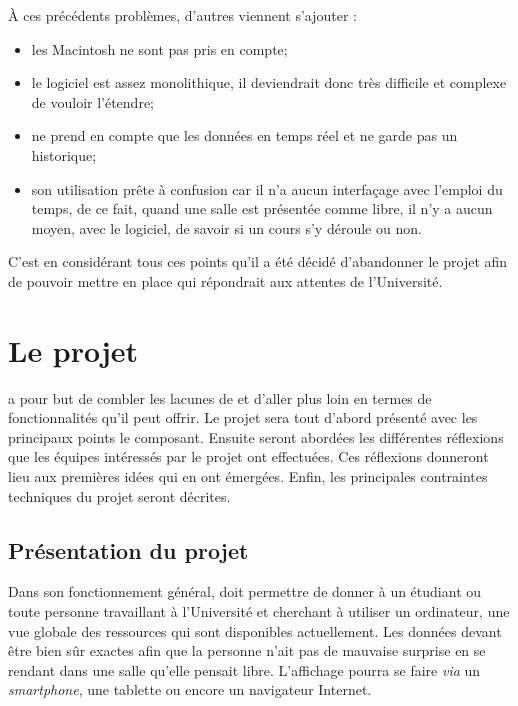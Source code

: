 \noindent \`A ces pr\'ec\'edents probl\`emes, d'autres viennent s'ajouter :

\begin{itemize}
	\item les Macintosh ne sont pas pris en compte;
	\item le logiciel est assez monolithique, il deviendrait donc tr\`es difficile et complexe de vouloir l'\'etendre;
	\item {\Yuukou} ne prend en compte que les donn\'ees en temps r\'eel et ne garde pas un historique;
	\item son utilisation pr\^ete \`a confusion car il n'a aucun interfa\c{c}age avec l'emploi du temps, de ce fait, quand une salle est pr\'esent\'ee comme libre, il n'y a aucun moyen, avec le logiciel, de savoir si un cours s'y d\'eroule ou non.

\end{itemize}

\vspace{0.20cm}

C'est en consid\'erant tous ces points qu'il a \'et\'e d\'ecid\'e d'abandonner le projet \Yuukou{} afin de pouvoir mettre en place \YuukouII{} qui r\'epondrait aux attentes de l'Universit\'e.

\section{Le projet \YuukouII}

{\YuukouII} a pour but de combler les lacunes de {\Yuukou} et d'aller plus loin en termes de fonctionnalit\'es qu'il peut offrir. 
Le projet sera tout d'abord pr\'esent\'e avec les principaux points le composant.
Ensuite seront abord\'ees les diff\'erentes r\'eflexions que les \'equipes int\'eress\'es par le projet ont effectu\'ees.
Ces r\'eflexions donneront lieu aux premi\`eres id\'ees qui en ont \'emerg\'ees.
Enfin, les principales contraintes techniques du projet seront d\'ecrites.

\subsection{Pr\'esentation du projet}

Dans son fonctionnement g\'en\'eral, {\YuukouII} doit permettre de donner \`a un \'etudiant ou toute personne travaillant \`a l'Universit\'e et cherchant \`a utiliser un ordinateur, une vue globale des ressources qui sont disponibles actuellement.
Les donn\'ees devant \^etre bien s\^ur exactes afin que la personne n'ait pas de mauvaise surprise en se rendant dans une salle qu'elle pensait libre.
L'affichage pourra se faire \textit{via} un \textit{smartphone}, une tablette ou encore un navigateur Internet.

